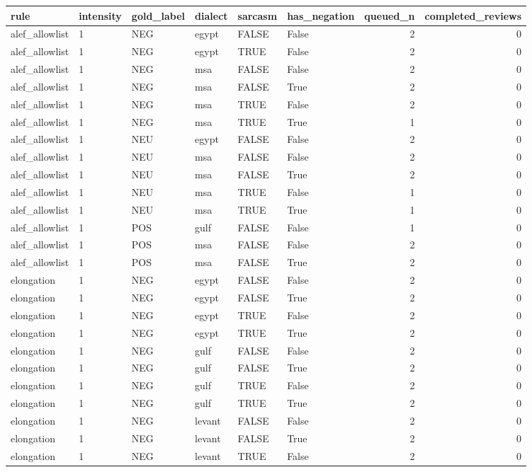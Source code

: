 \begin{tabular}{llllllrr}
\toprule
rule & intensity & gold_label & dialect & sarcasm & has_negation & queued_n & completed_reviews \\
\midrule
alef_allowlist & 1 & NEG & egypt & FALSE & False & 2 & 0 \\
alef_allowlist & 1 & NEG & egypt & TRUE & False & 2 & 0 \\
alef_allowlist & 1 & NEG & msa & FALSE & False & 2 & 0 \\
alef_allowlist & 1 & NEG & msa & FALSE & True & 2 & 0 \\
alef_allowlist & 1 & NEG & msa & TRUE & False & 2 & 0 \\
alef_allowlist & 1 & NEG & msa & TRUE & True & 1 & 0 \\
alef_allowlist & 1 & NEU & egypt & FALSE & False & 2 & 0 \\
alef_allowlist & 1 & NEU & msa & FALSE & False & 2 & 0 \\
alef_allowlist & 1 & NEU & msa & FALSE & True & 2 & 0 \\
alef_allowlist & 1 & NEU & msa & TRUE & False & 1 & 0 \\
alef_allowlist & 1 & NEU & msa & TRUE & True & 1 & 0 \\
alef_allowlist & 1 & POS & gulf & FALSE & False & 1 & 0 \\
alef_allowlist & 1 & POS & msa & FALSE & False & 2 & 0 \\
alef_allowlist & 1 & POS & msa & FALSE & True & 2 & 0 \\
elongation & 1 & NEG & egypt & FALSE & False & 2 & 0 \\
elongation & 1 & NEG & egypt & FALSE & True & 2 & 0 \\
elongation & 1 & NEG & egypt & TRUE & False & 2 & 0 \\
elongation & 1 & NEG & egypt & TRUE & True & 2 & 0 \\
elongation & 1 & NEG & gulf & FALSE & False & 2 & 0 \\
elongation & 1 & NEG & gulf & FALSE & True & 2 & 0 \\
elongation & 1 & NEG & gulf & TRUE & False & 2 & 0 \\
elongation & 1 & NEG & gulf & TRUE & True & 2 & 0 \\
elongation & 1 & NEG & levant & FALSE & False & 2 & 0 \\
elongation & 1 & NEG & levant & FALSE & True & 2 & 0 \\
elongation & 1 & NEG & levant & TRUE & False & 2 & 0 \\

\end{tabular}
